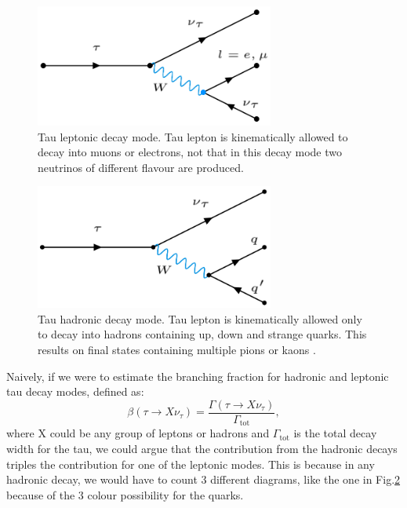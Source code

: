 \begin{figure}[h]
	\centering
	\includegraphics[width=0.7\textwidth]{figures/Fig1}
	\caption{Tau leptonic decay mode. Tau lepton is kinematically allowed to decay into muons or electrons, not that in this decay mode two neutrinos of different flavour are produced.}
	\label{Fig1}
\end{figure}

\begin{figure}[h]
	\centering
	\includegraphics[width=0.7\textwidth]{figures/Fig2}
	\caption{Tau hadronic decay mode. Tau lepton is kinematically allowed only to decay into hadrons containing up, down and strange quarks. This results on final states containing multiple pions or kaons \cite{Davier_2006}.}
	\label{Fig2}
\end{figure}
Naively, if we were to estimate the branching fraction for hadronic and leptonic tau decay modes, defined as:
\begin{equation}
	\beta(\tau\to X\nu_\tau)=\frac{\Gamma(\tau\to X\nu_\tau)}{\Gamma_{\text{tot}}},
\end{equation}
where X could be any group of leptons or hadrons and $\Gamma_{\text{tot}}$ is the total decay width for the tau, we could argue that the contribution from the hadronic decays triples the contribution for one of the leptonic modes. This is because in any hadronic decay, we would have to count 3 different diagrams, like the one in Fig.\ref{Fig2} because of the 3 colour possibility for the quarks.


